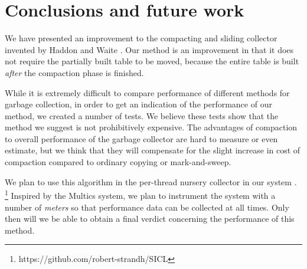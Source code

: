 \section{Conclusions and future work}

We have presented an improvement to the compacting and sliding
collector invented by Haddon and Waite \cite{Haddon:1967}.  Our method
is an improvement in that it does not require the partially built
table to be moved, because the entire table is built \emph{after}
the compaction phase is finished. 

While it is extremely difficult to compare performance of different
methods for garbage collection, in order to get an indication of the
performance of our method, we created a number of tests.  We believe
these tests show that the method we suggest is not prohibitively
expensive.  The advantages of compaction to overall performance of the
garbage collector are hard to measure or even estimate, but we think
that they will compensate for the slight increase in cost of
compaction compared to ordinary copying or mark-and-sweep.

We plan to use this algorithm in the per-thread nursery collector in
our system \sicl{}.%
\footnote{https://github.com/robert-strandh/SICL}
Inspired by the Multics system, we plan to
instrument the system with a number of \emph{meters} so that
performance data can be collected at all times.  Only then will we be
able to obtain a final verdict concerning the performance of this
method. 

